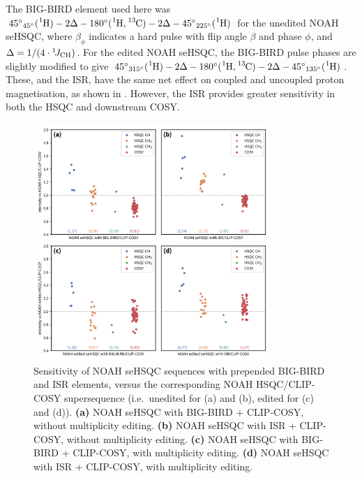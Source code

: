 The BIG-BIRD element used here was ${45^\circ}_{45^\circ}(\proton{}) - 2\Delta - 180^\circ(\proton{},\carbon{}) - 2\Delta - {45^\circ}_{225^\circ}(\proton{})$ for the unedited NOAH seHSQC, where $\beta_\phi$ indicates a hard pulse with flip angle $\beta$ and phase $\phi$, and $\Delta = 1/(4\cdot\onejch)$.
For the edited NOAH seHSQC, the BIG-BIRD pulse phases are slightly modified to give ${45^\circ}_{315^\circ}(\proton{}) - 2\Delta - 180^\circ(\proton{},\carbon{}) - 2\Delta - {45^\circ}_{135^\circ}(\proton{})$.
These, and the ISR, have the same net effect on coupled and uncoupled proton magnetisation, as shown in .
However, the ISR provides greater sensitivity in both the HSQC and downstream COSY.

\begin{figure}
    \centering
    \includegraphics[width=0.8\textwidth]{./figures/bigbird.png}
    \caption{
        Sensitivity of NOAH seHSQC sequences with prepended BIG-BIRD and ISR elements, versus the corresponding NOAH HSQC/CLIP-COSY supersequence (i.e.\ unedited for (a) and (b), edited for (c) and (d)).
        \textbf{(a)} NOAH seHSQC with BIG-BIRD + CLIP-COSY, without multiplicity editing.
        \textbf{(b)} NOAH seHSQC with ISR + CLIP-COSY, without multiplicity editing.
        \textbf{(c)} NOAH seHSQC with BIG-BIRD + CLIP-COSY, with multiplicity editing.
        \textbf{(d)} NOAH seHSQC with ISR + CLIP-COSY, with multiplicity editing.
        \andro{}
    }
    \label{fig:bigbird}
\end{figure}


